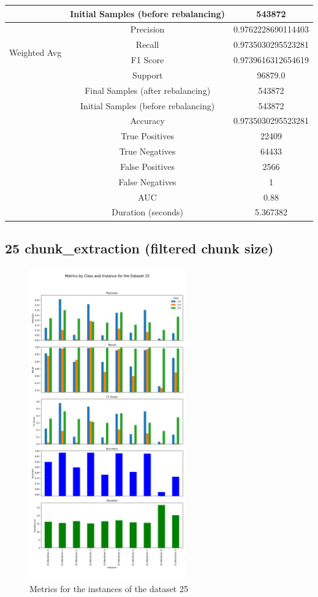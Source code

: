 \begin{longtable}{|c|c|c|}
 & Initial Samples (before rebalancing) & 543872 \\
\hline
\multirow{4}{*}{Weighted Avg} & Precision & 0.9762228690114403 \\
 & Recall & 0.9735030295523281 \\
 & F1 Score & 0.9739616312654619 \\
 & Support & 96879.0 \\
 & Final Samples (after rebalancing) & 543872 \\
 & Initial Samples (before rebalancing) & 543872 \\
\hline
& Accuracy & 0.9735030295523281 \\ \hline
& True Positives & 22409 \\ \hline
& True Negatives & 64433 \\ \hline
& False Positives & 2566 \\ \hline
& False Negatives & 1 \\ \hline
& AUC & 0.88 \\ \hline
& Duration (seconds) & 5.367382 \\ \hline
\end{longtable}


\subsection{25 chunk\_extraction (filtered chunk size)}

\begin{figure}[H]
\centering
\includegraphics[width=0.6\textwidth]{img/annexes/25/25 - Metrics.png}
\caption{Metrics for the instances of the dataset 25}
\label{fig:25_metrics_instance}
\end{figure}

